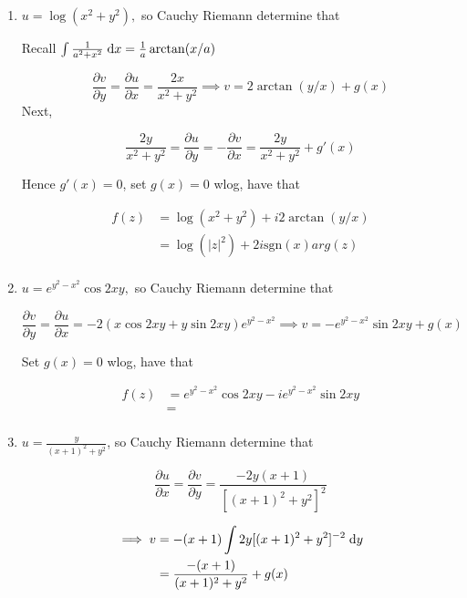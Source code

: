 \documentclass[a4paper]{article}
\begin{document}
\begin{enumerate}
	
		
	\item $ u = \log(x^{2}+y^{2}), $ so Cauchy Riemann determine that
	
	Recall $ \int \frac{1}{a^{2} + x^{2}} \; \mathrm{d} x = \frac{1}{a} \arctan(x/a) $
	
	\[ \frac{\partial v }{\partial y} = \frac{\partial u }{\partial x } = \frac{2x}{x^{2}+y^{2}} \implies v = 2 \arctan (y/x) + g(x)   \]
	Next,
	
	\[ \frac{2y}{x^{2}+y^{2}}  = \frac{\partial u }{\partial y} = - \frac{\partial v}{\partial x} =  \frac{2y}{x^{2}+y^{2}} + g'(x) \]
		
	Hence $ g'(x) = 0 $, set $ g(x) = 0 $ wlog, have that 
	
	
	\begin{align*}
	f(z) & = \log(x^{2}+y^{2})  +  i 2 \arctan (y/x) \\
	& = \log(| z |^{2}) + 2 i \text{sgn}(x) arg(z) \\
	\end{align*}
	
	
	\item $ u = e^{y^{2} - x^{2}} \cos 2 x y, $ so Cauchy Riemann determine that
	
	
	\[ \frac{\partial v }{\partial y} = \frac{\partial u }{\partial x } = -2(x\cos 2xy +y \sin 2xy)e^{y^{2} - x^{2}} \implies v =  -e^{y^{2} - x^{2}} \sin 2 x y + g(x)   \]
	
	Set $ g(x) = 0 $ wlog, have that 
	
	
	\begin{align*}
	f(z) & = e^{y^{2} - x^{2}} \cos 2 x y - i e^{y^{2} - x^{2}} \sin 2 x y \\
	& =  \\
	\end{align*}
	
	
	
	
		
	\item $ u = \frac{y}{(x+1)^{2} + y^{2}} $, so Cauchy Riemann determine that
	
	
		
	\[ \frac{\partial u }{\partial x} = \frac{\partial v }{\partial y} =   \frac{-2y(x+1)}{[(x+1)^{2} + y^{2}]^{2}}  \]
	
	\begin{align*}
	\implies v & = -(x+1)\int 2y [(x+1)^{2} + y^{2}]^{-2} \; \mathrm{d} y   \\
	& = \frac{-(x+1)}{(x+1)^{2} + y^{2}} + g(x)
	\end{align*}
	

\end{enumerate}
\end{document}
